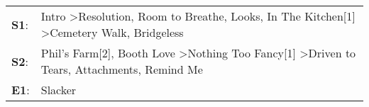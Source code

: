 \begin{supertabular}{p{0.03\textwidth}p{0.92\textwidth}}
 \textbf{S1}:  &  Intro\textsuperscript{} \textgreater \enspace Resolution\textsuperscript{}, \enspace Room to Breathe\textsuperscript{}, \enspace Looks\textsuperscript{}, \enspace In The Kitchen[1]\textsuperscript{} \textgreater \enspace Cemetery Walk\textsuperscript{}, \enspace Bridgeless\textsuperscript{}  \enspace  \\
 \textbf{S2}:  &                           Phil's Farm[2]\textsuperscript{}, \enspace Booth Love\textsuperscript{} \textgreater \enspace Nothing Too Fancy[1]\textsuperscript{} \textgreater \enspace Driven to Tears\textsuperscript{}, \enspace Attachments\textsuperscript{}, \enspace Remind Me\textsuperscript{}  \enspace  \\
 \textbf{E1}:  &                                                                                                                                                                                                                                                                            Slacker\textsuperscript{}  \enspace  \\
\end{supertabular}
